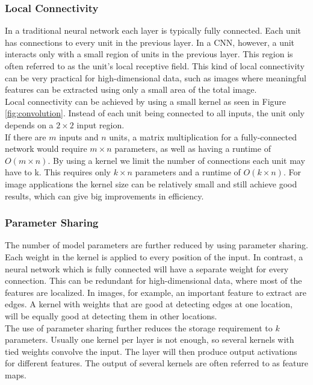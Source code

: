 \subsubsection{Local Connectivity}
In a traditional neural network each layer is typically fully connected. Each unit has connections to every unit in the previous layer. In a \ac{CNN}, however, a unit  interacts only with a small region of units in the previous layer. This region is often referred to as the unit's local receptive field. This kind of local connectivity can be very practical for high-dimensional data, such as images where meaningful features can be extracted using only a small area of the total image. \\

Local connectivity can be achieved by using a small kernel as seen in Figure \ref{fig:convolution}. Instead of each unit being connected to all inputs, the unit only depends on a $2 \times 2$ input region. \\

If there are $m$ inputs and $n$ units, a matrix multiplication for a fully-connected network would require $m\times n$ parameters, as well as having a runtime of $O(m\times n)$. By using a kernel we limit the number of connections each unit may have to k. This requires only $k\times n$ parameters and a runtime of $O(k\times n)$. For image applications the kernel size can be relatively small and still achieve good results, which can give big improvements in efficiency.

\subsubsection{Parameter Sharing}
The number of model parameters are further reduced by using parameter sharing. Each weight in the kernel is applied to every position of the input. In contrast, a neural network which is fully connected will have a separate weight for every connection. This can be redundant for high-dimensional data, where most of the features are localized. In images, for example, an important feature to extract are edges. A kernel with weights that are good at detecting edges at one location, will be equally good at detecting them in other locations. \\

The use of parameter sharing further reduces the storage requirement to $k$ parameters. Usually one kernel per layer is not enough, so several kernels with tied weights convolve the input. The layer will then produce output activations for different features. The output of several kernels are often referred to as feature maps.

